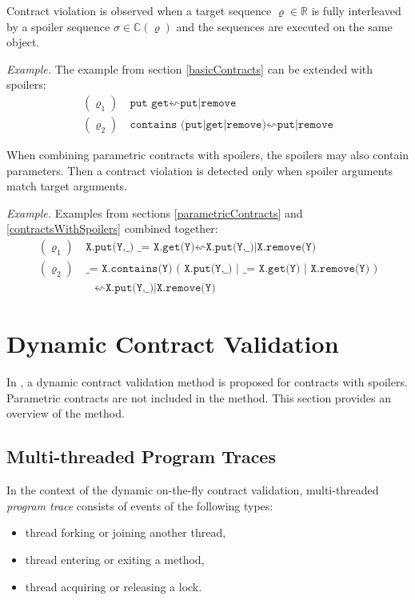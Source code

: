 Contract violation is observed when a target sequence $\varrho \in \mathbb{R}$
is fully interleaved by a spoiler sequence $\sigma \in \mathbb{C}(\varrho)$ and
the sequences are executed on the same object.

\emph{Example.} The example from section \ref{basicContracts} can be extended
with spoilers:
\begin{align*}
    (\varrho_1) &\ \texttt{put get} \leftsquigarrow \texttt{put|remove}\\
    (\varrho_2) &\ \texttt{contains (put|get|remove)} \leftsquigarrow
    \texttt{put|remove}
\end{align*}

When combining parametric contracts with spoilers, the spoilers may also contain
parameters. Then a contract violation is detected only when spoiler arguments
match target arguments.

\emph{Example.} Examples from sections \ref{parametricContracts} and
\ref{contractsWithSpoilers} combined together:
\begin{align*}
    (\varrho_1) &\ \texttt{X.put(Y,\_) \_ = X.get(Y)} \leftsquigarrow
    \texttt{X.put(Y,\_)|X.remove(Y)}\\
    (\varrho_2) &\ \texttt{\_ = X.contains(Y) ( X.put(Y,\_) | \_ = X.get(Y) |
    X.remove(Y) )}\\
    &\quad \leftsquigarrow \texttt{X.put(Y,\_)|X.remove(Y)}
\end{align*}


\section{Dynamic Contract Validation}

In \cite{contracts}, a dynamic contract validation method is proposed for
contracts with spoilers. Parametric contracts are not included in the method.
This section provides an overview of the method.

\subsection{Multi-threaded Program Traces}

In the context of the dynamic on-the-fly contract validation, multi-threaded
\emph{program trace} consists of events of the following types:
\begin{itemize}
    \item thread forking or joining another thread,
    \item thread entering or exiting a method,
    \item thread acquiring or releasing a lock.
\end{itemize}

